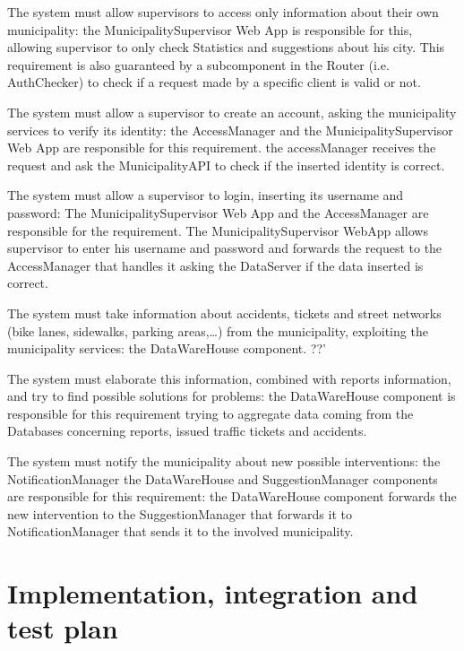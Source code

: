 \documentclass[a4paper]{report}
\begin{document}
\begin{enumerate}[start=1,label={[R\arabic*]}]
\item The system must allow supervisors to access only information about their own municipality: the MunicipalitySupervisor Web App  is responsible for this, allowing supervisor to only check Statistics and suggestions about his city. This requirement is also guaranteed by a subcomponent in the Router (i.e. AuthChecker) to check if a request made by a specific client is valid or not.
\item The system must allow a supervisor to create an account, asking the municipality services to verify its identity: the AccessManager and the MunicipalitySupervisor Web App are responsible for this requirement. the accessManager receives the request and ask the MunicipalityAPI to check if the inserted identity is correct.
\item The system must allow a supervisor to login, inserting its username and password: The MunicipalitySupervisor Web App and the AccessManager are responsible for the requirement. The MunicipalitySupervisor WebApp allows supervisor to enter his username and password and forwards the request to the AccessManager that handles it asking the DataServer if the data inserted is correct.
\item The system must take information about accidents, tickets and street networks (bike lanes, sidewalks, parking areas,…) from the municipality, exploiting the municipality services: the DataWareHouse component. ??'
\item The system must elaborate this information, combined with reports information, and try to find possible solutions for problems: the DataWareHouse component is responsible for this requirement trying to aggregate data coming from the Databases concerning reports, issued traffic tickets and accidents.
\item The system must notify the municipality about new possible interventions: the NotificationManager the DataWareHouse and SuggestionManager components are responsible for this requirement: the DataWareHouse component forwards the new intervention to the SuggestionManager that forwards it to NotificationManager that sends it to  the involved municipality.

\end{enumerate}

\chapter{Implementation, integration and test plan}
\end{document}

